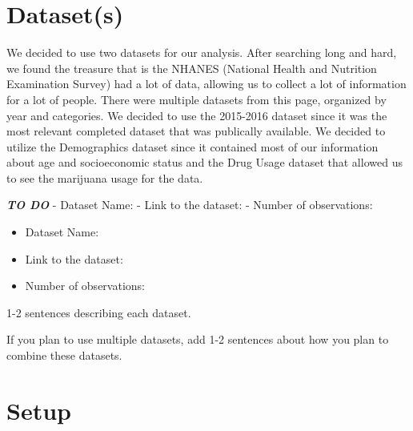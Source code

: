 \documentclass[11pt]{article}
\providecommand{\tightlist}{%
      \setlength{\itemsep}{0pt}\setlength{\parskip}{0pt}}
\begin{document}
    \section{Dataset(s)}\label{datasets}

    We decided to use two datasets for our analysis. After searching long
and hard, we found the treasure that is the NHANES (National Health and
Nutrition Examination Survey) had a lot of data, allowing us to collect
a lot of information for a lot of people. There were multiple datasets
from this page, organized by year and categories. We decided to use the
2015-2016 dataset since it was the most relevant completed dataset that
was publically available. We decided to utilize the Demographics dataset
since it contained most of our information about age and socioeconomic
status and the Drug Usage dataset that allowed us to see the marijuana
usage for the data.

\textbf{\emph{TO DO}} - Dataset Name: - Link to the dataset: - Number of
observations:

\begin{itemize}
\tightlist
\item
  Dataset Name:
\item
  Link to the dataset:
\item
  Number of observations:
\end{itemize}

1-2 sentences describing each dataset.

If you plan to use multiple datasets, add 1-2 sentences about how you
plan to combine these datasets.

    \section{Setup}\label{setup}
\end{document}
